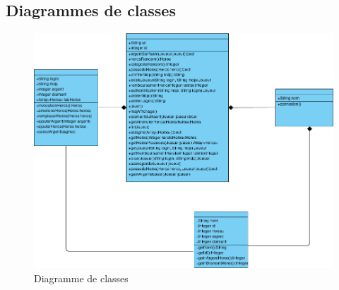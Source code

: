 \subsection{Diagrammes de classes}

    \begin{figure}[ht!]
        \centering
            \includegraphics[width=1\textwidth]{images/Diagramme_de_classe_TW2_V4.png}
        \caption{Diagramme de classes}
    \end{figure}
